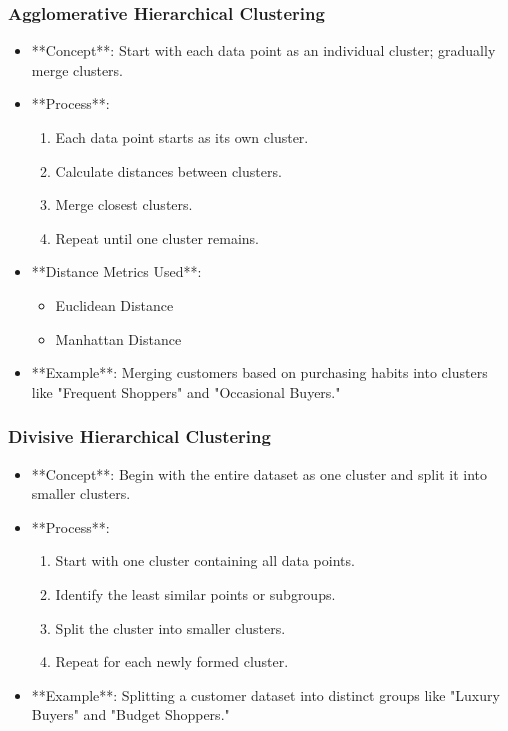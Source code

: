 \documentclass[aspectratio=169]{beamer}
\begin{document}
\begin{frame}[fragile]
    \frametitle{Agglomerative Hierarchical Clustering}
    \begin{itemize}
        \item **Concept**: Start with each data point as an individual cluster; gradually merge clusters.
        \item **Process**:
        \begin{enumerate}
            \item Each data point starts as its own cluster.
            \item Calculate distances between clusters.
            \item Merge closest clusters.
            \item Repeat until one cluster remains.
        \end{enumerate}
        \item **Distance Metrics Used**:
        \begin{itemize}
            \item Euclidean Distance
            \item Manhattan Distance
        \end{itemize}
        \item **Example**: Merging customers based on purchasing habits into clusters like "Frequent Shoppers" and "Occasional Buyers."
    \end{itemize}
\end{frame}

\begin{frame}[fragile]
    \frametitle{Divisive Hierarchical Clustering}
    \begin{itemize}
        \item **Concept**: Begin with the entire dataset as one cluster and split it into smaller clusters.
        \item **Process**:
        \begin{enumerate}
            \item Start with one cluster containing all data points.
            \item Identify the least similar points or subgroups.
            \item Split the cluster into smaller clusters.
            \item Repeat for each newly formed cluster.
        \end{enumerate}
        \item **Example**: Splitting a customer dataset into distinct groups like "Luxury Buyers" and "Budget Shoppers."
    \end{itemize}
\end{frame}
\end{document}
